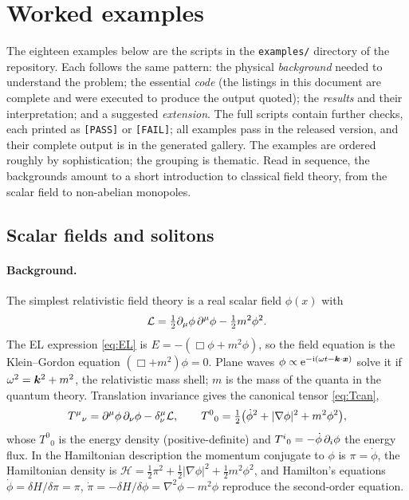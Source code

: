 \section{Worked examples}
\label{part:examples}

The eighteen examples below are the scripts in the \texttt{examples/} directory of the repository. Each follows the same pattern: the physical \emph{background} needed to understand the problem; the essential \emph{code} (the listings in this document are complete and were executed to produce the output quoted); the \emph{results} and their interpretation; and a suggested \emph{extension}. The full scripts contain further checks, each printed as \texttt{[PASS]} or \texttt{[FAIL]}; all examples pass in the released version, and their complete output is in the generated gallery. The examples are ordered roughly by sophistication; the grouping is thematic. Read in sequence, the backgrounds amount to a short introduction to classical field theory, from the scalar field to non-abelian monopoles.

\subsection{Scalar fields and solitons}


\paragraph{Background.} The simplest relativistic field theory is a real scalar field $\phi(x)$ with
\begin{equation}
\mathcal L=\tfrac12\partial_\mu\phi\,\partial^\mu\phi-\tfrac12m^2\phi^2.
\label{eq:KG}
\end{equation}
The EL expression \cref{eq:EL} is $E=-(\Box\phi+m^2\phi)$, so the field equation is the Klein--Gordon equation $(\Box+m^2)\phi=0$. Plane waves $\phi\propto\mathrm{e}^{-\mathrm{i}(\omega t-\bm{k}\cdot\bm{x})}$ solve it if $\omega^2=\bm{k}^2+m^2$, the relativistic mass shell; $m$ is the mass of the quanta in the quantum theory. Translation invariance gives the canonical tensor \cref{eq:Tcan},
\begin{equation}
T^\mu{}_\nu=\partial^\mu\phi\,\partial_\nu\phi-\delta^\mu_\nu\mathcal L,\qquad T^0{}_0=\tfrac12\big(\dot\phi^2+|\nabla\phi|^2+m^2\phi^2\big),
\end{equation}
whose $T^0{}_0$ is the energy density (positive-definite) and $T^i{}_0=-\dot\phi\,\partial_i\phi$ the energy flux. In the Hamiltonian description the momentum conjugate to $\phi$ is $\pi=\dot\phi$, the Hamiltonian density is $\mathcal H=\tfrac12\pi^2+\tfrac12|\nabla\phi|^2+\tfrac12m^2\phi^2$, and Hamilton's equations $\dot\phi=\delta H/\delta\pi=\pi$, $\dot\pi=-\delta H/\delta\phi=\nabla^2\phi-m^2\phi$ reproduce the second-order equation.

